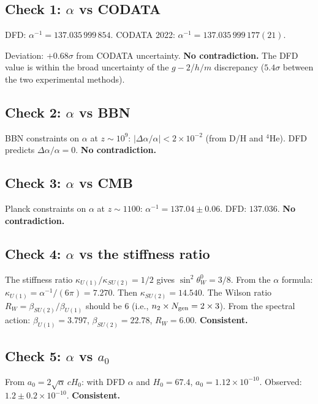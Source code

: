 \documentclass[11pt,a4paper]{article}
\begin{document}
\subsection{Check 1: $\alpha$ vs CODATA}

DFD: $\alpha^{-1} = 137.035\,999\,854$.
CODATA 2022: $\alpha^{-1} = 137.035\,999\,177(21)$.

Deviation: $+0.68\sigma$ from CODATA uncertainty. \textbf{No contradiction.} The DFD value is within the broad uncertainty of the $g-2$/$h/m$ discrepancy ($5.4\sigma$ between the two experimental methods).

\subsection{Check 2: $\alpha$ vs BBN}

BBN constraints on $\alpha$ at $z \sim 10^9$: $|\Delta\alpha/\alpha| < 2 \times 10^{-2}$ (from D/H and $^4$He). DFD predicts $\Delta\alpha/\alpha = 0$. \textbf{No contradiction.}

\subsection{Check 3: $\alpha$ vs CMB}

Planck constraints on $\alpha$ at $z \sim 1100$: $\alpha^{-1} = 137.04 \pm 0.06$. DFD: $137.036$. \textbf{No contradiction.}

\subsection{Check 4: $\alpha$ vs the stiffness ratio}

The stiffness ratio $\kappa_{U(1)}/\kappa_{SU(2)} = 1/2$ gives $\sin^2\theta_W^0 = 3/8$. From the $\alpha$ formula: $\kappa_{U(1)} = \alpha^{-1}/(6\pi) = 7.270$. Then $\kappa_{SU(2)} = 14.540$. The Wilson ratio $R_W = \beta_{SU(2)}/\beta_{U(1)}$ should be 6 (i.e., $n_2 \times N_{\rm gen} = 2 \times 3$). From the spectral action: $\beta_{U(1)} = 3.797$, $\beta_{SU(2)} = 22.78$, $R_W = 6.00$. \textbf{Consistent.}

\subsection{Check 5: $\alpha$ vs $a_0$}

From $a_0 = 2\sqrt{\alpha}\,cH_0$: with DFD $\alpha$ and $H_0 = 67.4$, $a_0 = 1.12 \times 10^{-10}$. Observed: $1.2 \pm 0.2 \times 10^{-10}$. \textbf{Consistent.}
\end{document}
